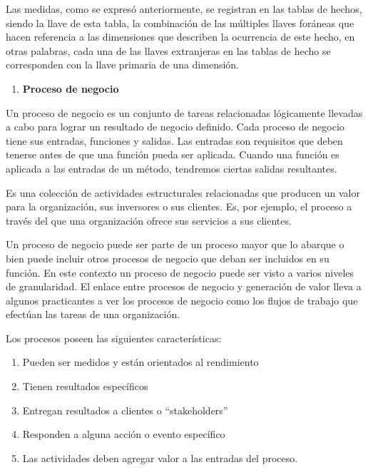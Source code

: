 \noindent 

\noindent Las medidas, como se expres\'{o} anteriormente, se registran en las tablas de hechos, siendo la llave de esta tabla, la combinaci\'{o}n de las m\'{u}ltiples llaves for\'{a}neas que hacen referencia   a las dimensiones que describen la ocurrencia de este hecho, en otras palabras, cada una de las llaves extranjeras en las tablas de hecho se corresponden con la llave primaria de una dimensi\'{o}n. 


\noindent 

\begin{enumerate}
\item  \textbf{Proceso de negocio}
\end{enumerate}

\noindent 


\noindent Un proceso de negocio es un conjunto de tareas relacionadas l\'{o}gicamente llevadas a cabo para lograr un resultado de negocio definido. Cada proceso de negocio tiene sus entradas, funciones y salidas. Las entradas son requisitos que deben tenerse antes de que una funci\'{o}n pueda ser aplicada. Cuando una funci\'{o}n es aplicada a las entradas de un m\'{e}todo, tendremos ciertas salidas resultantes.

\noindent 

\noindent Es una colecci\'{o}n de actividades estructurales relacionadas que producen un valor para la organizaci\'{o}n, sus inversores o sus clientes. Es, por ejemplo, el proceso a trav\'{e}s del que una organizaci\'{o}n ofrece sus servicios a sus clientes.

\noindent 

\noindent Un proceso de negocio puede ser parte de un proceso mayor que lo abarque o bien puede incluir otros procesos de negocio que deban ser incluidos en su funci\'{o}n. En este contexto un proceso de negocio puede ser visto a varios niveles de granularidad. El enlace entre procesos de negocio y generaci\'{o}n de valor lleva a algunos practicantes a ver los procesos de negocio como los flujos de trabajo que efect\'{u}an las tareas de una organizaci\'{o}n. 

\noindent 

\noindent Los procesos poseen las siguientes caracter\'{i}sticas:

\noindent 

\begin{enumerate}
\item  Pueden ser medidos y est\'{a}n orientados al rendimiento

\item  Tienen resultados espec\'{i}ficos

\item  Entregan resultados a clientes o ``stakeholders''

\item  Responden a alguna acci\'{o}n o evento espec\'{i}fico

\item  Las actividades deben agregar valor a las entradas del proceso.
\end{enumerate}


